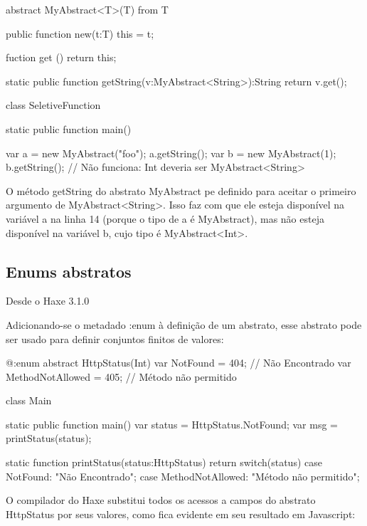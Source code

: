 {{{{abstract MyAbstract<T>(T) from T {
    public function new(t:T) this = t;

    fuction get () return this;

    static public function
    getString(v:MyAbstract<String>):String {
        return v.get();
    }
}

class SeletiveFunction {
    static public function main() {
       var a = new MyAbstract("foo");
       a.getString();
       var b = new MyAbstract(1);
       b.getString(); // Não funciona: Int deveria ser MyAbstract<String> 

    }
}

O método getString do abstrato MyAbstract pe definido para aceitar o primeiro argumento de MyAbstract<String>. Isso faz com que ele esteja disponível na variável a na linha 14 (porque o tipo de a é MyAbstract), mas não esteja disponível na variável b, cujo tipo é MyAbstract<Int>.


\subsection{Enums abstratos}

Desde o Haxe 3.1.0

Adicionando-se o metadado :enum à definição de um abstrato, esse abstrato pode ser usado para definir conjuntos finitos de valores:

@:enum 
abstract HttpStatus(Int) {
    var NotFound = 404; // Não Encontrado
    var MethodNotAllowed = 405; // Método não permitido
}

class Main {
    static public function main() {
        var status = HttpStatus.NotFound;
        var msg = printStatus(status);
    }

    static function
    printStatus(status:HttpStatus) {
        return switch(status) {
            case NotFound:
                "Não Encontrado";
            case MethodNotAllowed:
                "Método não permitido";
        }
    }
}

O compilador do Haxe substitui todos os acessos a campos do abstrato HttpStatus por seus valores, como fica evidente em seu resultado em Javascript:

}}}}
